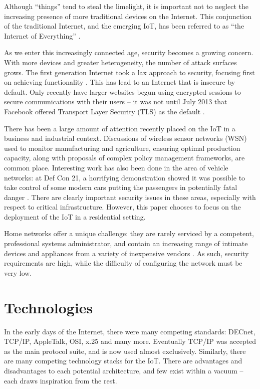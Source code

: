 \documentclass[10pt,journal,compsoc]{IEEEtran}
\begin{document}
Although ``things'' tend to steal the limelight, it is important not to neglect
the increasing presence of more traditional devices on the Internet. This
conjunction of the traditional Internet, and the emerging IoT, has been
referred to as ``the Internet of Everything'' \cite{CiscoEverything}. 

As we enter this increasingly connected age, security becomes a growing
concern. With more devices and greater heterogeneity, the number of attack
surfaces grows. The first generation Internet took a lax approach to security,
focusing first on achieving functionality \cite{Bhimani1996}. This has lead to
an Internet that is insecure by default. Only recently have larger websites
begun using encrypted sessions to secure communications with their users -- it
was not until July 2013 that Facebook offered Transport Layer Security (TLS) as
the default \cite{Facebook2013}. 

There has been a large amount of attention recently placed on the IoT in a
business and industrial context. Discussions of wireless sensor networks (WSN)
used to monitor manufacturing and agriculture, ensuring optimal production
capacity, along with proposals of complex policy management frameworks, are
common place. Interesting work has also been done in the area of vehicle
networks: at Def Con 21, a horrifying demonstration showed it was possible to
take control of some modern cars putting the passengers in potentially
fatal danger \cite{Illera2014}. There are clearly important security issues in
these areas, especially with respect to critical infrastructure.  However, this
paper chooses to focus on the deployment of the IoT in a residential setting. 

Home networks offer a unique challenge: they are rarely serviced by a competent,
professional systems administrator, and  contain an increasing range of
intimate devices and appliances from a variety of inexpensive vendors
\cite{ACM_ModHome}. As such, security requirements are high, while the
difficulty of configuring the network must be very low. 


\section{Technologies}
In the early days of the Internet, there were many competing standards: DECnet,
TCP/IP, AppleTalk, OSI, x.25 and many more. Eventually TCP/IP was accepted as
the main protocol suite, and is now used almost exclusively. Similarly, there
are many competing technology stacks for the IoT. There are advantages and
disadvantages to each potential architecture, and few exist within a vacuum --
each draws inspiration from the rest. 
\end{document}
